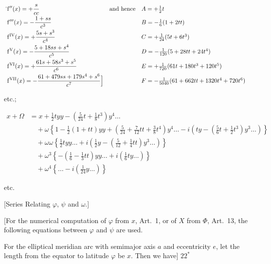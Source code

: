\[
\begin{array}{ll@{\quad}l}
\displaystyle\rlap{\hspace{-.3em}\raisebox{1.2ex}{.}}\mathrm f''(x)=+\frac{s}{cc}&\text{and hence}&A=+\tfrac12t\\[6pt]
\displaystyle\mathrm f'''(x)=-\frac{1+ss}{c^3}&&B=-\tfrac16(1+2tt)\\[6pt]
\displaystyle\mathrm f^{\mathrm{IV}}(x)=+\frac{5s+s^3}{c^4}&&C=+\tfrac1{24}(5t+6t^3)\\[6pt]
\displaystyle\mathrm f^{\mathrm V}(x)=-\frac{5+18ss+s^4}{c^5}&&D=-\tfrac1{120}(5+28tt+24t^4)\\[6pt]
\displaystyle\mathrm f^{\mathrm{VI}}(x)=+\frac{61s+58s^3+s^5}{c^6}&&E=+\tfrac1{720}(61t+180t^3+120t^5)\\[6pt]
\displaystyle\mathrm f^{\mathrm{VII}}(x)=-\frac{61+479ss+179s^4+s^6}{c^7}\Big]&&F=-\tfrac1{5040}(61+662tt+1320t^4+720t^6)
\end{array}
\]
\begin{center}etc.;\end{center}
\par{}
\begingroup\footnotesize
\[
\begin{aligned}
x+\Omega&=x+\tfrac12tyy-(\tfrac5{24}t+\tfrac18t^3)y^4\ldots\\
&\quad+\omega\left\{1-\tfrac12(1+tt)yy+(\tfrac5{24}+\tfrac7{12}tt+\tfrac38t^4)y^4\ldots-i\left(ty-(\tfrac56t+\tfrac12t^3)y^3\ldots\right)\right\}\\
&\quad+\omega\omega\left\{\tfrac12tyy\ldots+i\left(\tfrac12y-(\tfrac5{12}+\tfrac14tt)y^3\ldots\right)\right\}\\
&\quad+\omega^3\left\{-(\tfrac16-\tfrac13tt)yy\ldots+i(\tfrac16ty\ldots)\right\}\\
&\quad+\omega^4\left\{\ldots-i(\tfrac1{24}y\ldots)\right\}
\end{aligned}
\]
\begin{center}etc.\end{center}
\par\endgroup
\bigskip
\begin{center}
[Series Relating $\varphi$, $\psi$ and $\omega$.]\par\medskip
[21.]
\end{center}
[For the numerical computation of $\varphi$ from $x$, Art.~1, or of $X$ from $\Phi$, Art.~13, the following equations between $\varphi$ and $\psi$ are used.

For the elliptical meridian arc with semimajor axis $a$ and eccentricity $e$, let the length from the equator to latitude $\varphi$ be $x$. Then we have]
\vfill\hfill$22^*$\hspace*{2cm}\par
\endgroup
